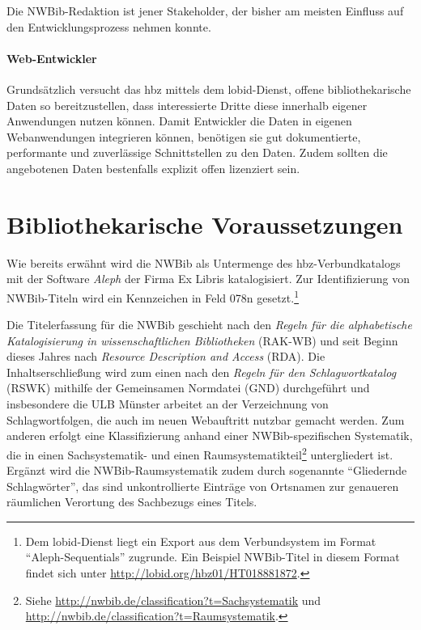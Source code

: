\documentclass[a4paper,
fontsize=11pt,
oneside,
numbers=noperiodatend,
parskip=half-,
bibliography=totoc,
final
]{scrartcl}
\begin{document}
Die NWBib-Redaktion ist jener Stakeholder, der bisher am meisten
Einfluss auf den Entwicklungsprozess nehmen konnte.

\paragraph{Web-Entwickler}\label{web-entwickler}

Grundsätzlich versucht das hbz mittels dem lobid-Dienst, offene
bibliothekarische Daten so bereitzustellen, dass interessierte Dritte
diese innerhalb eigener Anwendungen nutzen können. Damit Entwickler die
Daten in eigenen Webanwendungen integrieren können, benötigen sie gut
dokumentierte, performante und zuverlässige Schnittstellen zu den Daten.
Zudem sollten die angebotenen Daten bestenfalls explizit offen
lizenziert sein.

\section*{Bibliothekarische
Voraussetzungen}\label{bibliothekarische-voraussetzungen}

Wie bereits erwähnt wird die NWBib als Untermenge des
hbz-Verbundkatalogs mit der Software \emph{Aleph} der Firma Ex Libris
katalogisiert. Zur Identifizierung von NWBib-Titeln wird ein Kennzeichen
in Feld 078n gesetzt.\footnote{Dem lobid-Dienst liegt ein Export aus dem
  Verbundsystem im Format \enquote{Aleph-Sequentials} zugrunde. Ein
  Beispiel NWBib-Titel in diesem Format findet sich unter
  \url{http://lobid.org/hbz01/HT018881872}.}

Die Titelerfassung für die NWBib geschieht nach den \emph{Regeln für die
alphabetische Katalogisierung in wissenschaftlichen Bibliotheken}
(RAK-WB) und seit Beginn dieses Jahres nach \emph{Resource Description
and Access} (RDA). Die Inhaltserschließung wird zum einen nach den
\emph{Regeln für den Schlagwortkatalog} (RSWK) mithilfe der Gemeinsamen
Normdatei (GND) durchgeführt und insbesondere die ULB Münster arbeitet
an der Verzeichnung von Schlagwortfolgen, die auch im neuen Webauftritt
nutzbar gemacht werden. Zum anderen erfolgt eine Klassifizierung anhand
einer NWBib-spezifischen Systematik, die in einen Sachsystematik- und
einen Raumsystematikteil\footnote{Siehe
  \url{http://nwbib.de/classification?t=Sachsystematik} und
  \url{http://nwbib.de/classification?t=Raumsystematik}.} untergliedert
ist. Ergänzt wird die NWBib-Raumsystematik zudem durch sogenannte
\enquote{Gliedernde Schlagwörter}, das sind unkontrollierte Einträge von
Ortsnamen zur genaueren räumlichen Verortung des Sachbezugs eines
Titels.
\end{document}
